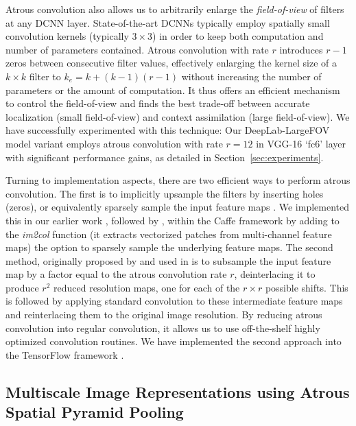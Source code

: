 \documentclass[10pt,journal,compsoc]{IEEEtran}
\newcommand{\by}[2]{\ensuremath{#1 \! \times \! #2}}
\begin{document}
Atrous convolution also allows us to arbitrarily enlarge the \emph{field-of-view} of
filters at any DCNN layer.
State-of-the-art DCNNs typically employ spatially small
convolution kernels (typically \by{3}{3}) in order to keep both computation and
number of parameters contained. Atrous convolution with rate $r$ introduces
$r-1$ zeros between consecutive filter values, effectively enlarging the kernel
size of a \by{k}{k} filter to $k_e = k + (k-1)(r-1)$ without increasing the
number of parameters or the amount of computation. It thus offers an efficient
mechanism to control the field-of-view and finds the best trade-off between
accurate localization (small field-of-view) and context assimilation (large
field-of-view). We have successfully experimented with this technique:
Our DeepLab-LargeFOV model variant \cite{chen2014semantic} employs atrous
convolution with rate $r = 12$ in VGG-16 `fc6' layer with significant
performance gains, as detailed in Section~\ref{sec:experiments}.

Turning to implementation aspects, 
there are two efficient ways to  perform atrous convolution. The first
is to implicitly upsample the filters by inserting holes (zeros), or
equivalently sparsely sample the input feature maps \cite{holschneider1989real}.
We implemented this in our earlier work \cite{papandreou2014untangling,
 chen2014semantic}, followed by \cite{yu2015multi}, within the Caffe framework
\cite{jia2014caffe} by adding to the \textsl{im2col} function (it extracts
vectorized patches from multi-channel feature maps) the option to sparsely
sample the underlying feature maps. The second method, originally proposed by
\cite{shensa1992discrete} and used in \cite{giusti2013fast, sermanet2013overfeat}
is to subsample the input feature map by a factor equal to the atrous
convolution rate $r$, deinterlacing it to produce $r^2$ reduced resolution maps,
one for each of the $\by{r}{r}$ possible shifts. This is followed by applying
standard convolution to these intermediate feature maps and reinterlacing them
to the original image resolution. By reducing atrous convolution into regular
convolution, it allows us to use off-the-shelf highly optimized convolution
routines. We have implemented the second approach into the TensorFlow framework
\cite{abadi2016tensorflow}.



\subsection{Multiscale Image Representations using Atrous Spatial Pyramid Pooling}
\end{document}
